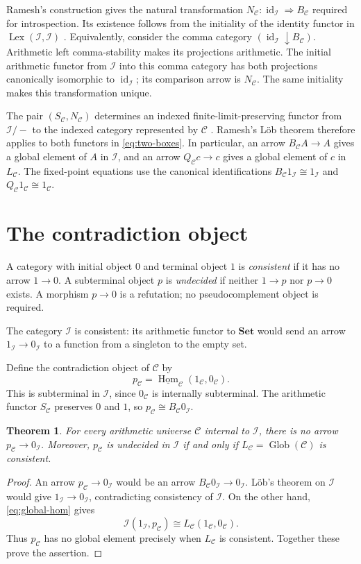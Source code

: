 \documentclass[10pt]{article}
\newtheorem{theorem}{Theorem}[section]
\newcommand{\I}{\mathcal I}
\newcommand{\C}{\mathcal C}
\newcommand{\Glob}{\operatorname{Glob}}
\newcommand{\Lex}{\operatorname{Lex}}
\newcommand{\Set}{\mathbf{Set}}
\newcommand{\hhom}{\underline{\operatorname{Hom}}}
\begin{document}
Ramesh's construction gives the natural transformation
$N_\C:\operatorname{id}_\I\Rightarrow B_\C$ required for introspection.
Its existence follows from the
initiality of the identity functor in $\Lex(\I,\I)$
\cite[Theorem~1.56 and Corollary~1.55]{Ramesh}.
Equivalently, consider the comma category $(\operatorname{id}_\I\mathbin\downarrow B_\C)$.
Arithmetic left comma-stability makes its projections arithmetic.
The initial arithmetic functor from $\I$ into this comma category
has both projections canonically isomorphic to $\operatorname{id}_\I$;
its comparison arrow is $N_\C$. The same initiality makes
this transformation unique.

The pair $(S_\C,N_\C)$ determines an indexed finite-limit-preserving
functor from $\I/{-}$ to the indexed category represented by $\C$
\cite[Theorem~2.5]{Ramesh}. Ramesh's L\"ob theorem therefore applies
to both functors in \eqref{eq:two-boxes}. In particular, an arrow
$B_\C A\to A$ gives a global element of $A$ in $\I$, and an
arrow $Q_\C c\to c$ gives a global element of $c$ in $L_\C$.
The fixed-point equations use the canonical identifications
$B_\C1_\I\cong1_\I$ and $Q_\C1_\C\cong1_\C$.

\section{The contradiction object}

A category with initial object $0$ and terminal object $1$ is
\emph{consistent} if it has no arrow $1\to0$.
A subterminal object $p$ is \emph{undecided} if neither
$1\to p$ nor $p\to0$ exists. A morphism $p\to0$ is a
refutation; no pseudocomplement object is required.

The category $\I$ is consistent: its arithmetic functor to $\Set$
would send an arrow $1_\I\to0_\I$ to a function from a singleton
to the empty set.

Define the contradiction object of $\C$ by
\begin{equation}\label{eq:contradiction}
 p_\C=\hhom_\C(1_\C,0_\C).
\end{equation}
This is subterminal in $\I$, since $0_\C$ is internally
subterminal. The arithmetic functor $S_\C$ preserves $0$ and $1$,
so $p_\C\cong B_\C0_\I$.

\begin{theorem}\label{thm:relative}
For every arithmetic universe $\C$ internal to $\I$, there is no
arrow $p_\C\to0_\I$.
Moreover, $p_\C$ is undecided in $\I$ if and only if
$L_\C=\Glob(\C)$ is consistent.
\end{theorem}
\begin{proof}
An arrow $p_\C\to0_\I$ would be an arrow
$B_\C0_\I\to0_\I$. L\"ob's theorem on $\I$ would give
$1_\I\to0_\I$, contradicting consistency of $\I$.
On the other hand, \eqref{eq:global-hom} gives
\[
 \I(1_\I,p_\C)\cong L_\C(1_\C,0_\C).
\]
Thus $p_\C$ has no global element precisely when $L_\C$ is
consistent. Together these prove the assertion.
\end{proof}
\end{document}
